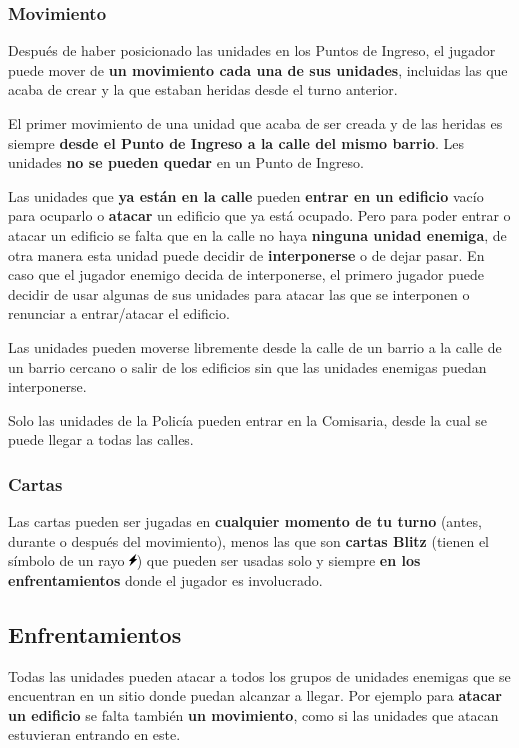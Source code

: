 \documentclass[a4paper,13pt]{scrartcl}
\begin{document}
\subsubsection*{Movimiento}
Despu\'es de haber posicionado las unidades en los Puntos de Ingreso, el jugador puede mover de \textbf{un movimiento cada una
de sus unidades}, incluidas las que acaba de crear y la que estaban heridas desde el turno anterior.

El primer movimiento de una unidad que acaba de ser creada y de las heridas es siempre \textbf{desde el Punto de Ingreso a la
calle del mismo barrio}. Les unidades \textbf{no se pueden quedar} en un Punto de Ingreso.

Las unidades que \textbf{ya est\'an en la calle} pueden \textbf{entrar en un edificio} vac\'io para ocuparlo o \textbf{atacar} un edificio que ya
est\'a ocupado. Pero para poder entrar o atacar un edificio se falta que en la calle no haya \textbf{ninguna unidad enemiga}, de
otra manera esta unidad puede decidir de \textbf{interponerse} o de dejar pasar. En caso que el jugador enemigo decida de
interponerse, el primero jugador puede decidir de usar algunas de sus unidades para atacar las que se interponen o
renunciar a entrar/atacar el edificio.

Las unidades pueden moverse libremente desde la calle de un barrio a la calle de un barrio cercano o salir de los
edificios sin que las unidades enemigas puedan interponerse.

Solo las unidades de la Polic\'ia pueden entrar en la Comisaria, desde la cual se puede llegar a todas las calles.

\subsubsection*{Cartas}
Las cartas pueden ser jugadas en \textbf{cualquier momento de tu turno} (antes, durante o despu\'es del movimiento), menos las
que son \textbf{cartas Blitz} (tienen el s\'imbolo de un rayo \includegraphics[height=9pt]{blitz.png}) que pueden ser usadas solo y siempre \textbf{en los enfrentamientos} donde
el jugador es involucrado.

\subsection{Enfrentamientos}
Todas las unidades pueden atacar a todos los grupos de unidades enemigas que se encuentran en un sitio donde puedan
alcanzar a llegar. Por ejemplo para \textbf{atacar un edificio} se falta tambi\'en \textbf{un movimiento}, como si las unidades que
atacan estuvieran entrando en este.
\end{document}
